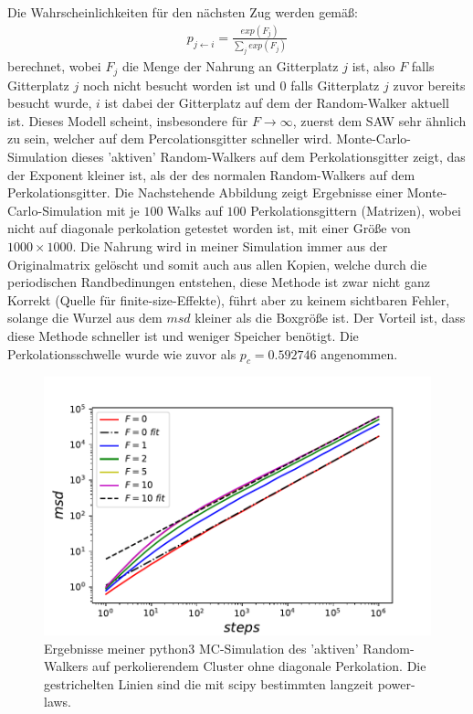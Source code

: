 \documentclass[a4paper, 12pt]{scrartcl}
\begin{document}
\noindent Die Wahrscheinlichkeiten für den nächsten Zug werden gemäß:
\begin{align}
	p_{j \leftarrow i} = \frac{exp({F_j})}{\sum_j exp({F_j})}
\end{align}
berechnet, wobei $F_j$ die Menge der Nahrung an Gitterplatz $j$ ist, also $F$ falls Gitterplatz $j$ noch nicht besucht worden ist und $0$ falls Gitterplatz $j$ zuvor bereits besucht wurde, $i$ ist dabei der Gitterplatz auf dem der Random-Walker aktuell ist. Dieses Modell scheint, insbesondere für $F \rightarrow \infty$, zuerst dem SAW sehr ähnlich zu sein, welcher auf dem Percolationsgitter schneller wird. Monte-Carlo-Simulation dieses 'aktiven' Random-Walkers auf dem Perkolationsgitter zeigt, das der Exponent kleiner ist, als der des normalen Random-Walkers auf dem Perkolationsgitter. Die Nachstehende Abbildung zeigt Ergebnisse einer Monte-Carlo-Simulation mit je $100$ Walks auf $100$ Perkolationsgittern (Matrizen), wobei nicht auf diagonale perkolation getestet worden ist, mit einer Größe von $1000 \times 1000$. Die Nahrung wird in meiner Simulation immer aus der Originalmatrix gelöscht und somit auch aus allen Kopien, welche durch die periodischen Randbedinungen entstehen, diese Methode ist zwar nicht ganz Korrekt (Quelle für finite-size-Effekte), führt aber zu keinem sichtbaren Fehler, solange die Wurzel aus dem $msd$ kleiner als die Boxgröße ist. Der Vorteil ist, dass diese Methode schneller ist und weniger Speicher benötigt. Die Perkolationsschwelle wurde wie zuvor als $p_c=0.592746$ angenommen.
\begin{figure}[h!]
	\centering
	\includegraphics[scale=0.9]{food.pdf}
	\caption{Ergebnisse meiner python3 MC-Simulation des 'aktiven' Random-Walkers auf perkolierendem Cluster ohne diagonale Perkolation. Die gestrichelten Linien sind die mit scipy bestimmten langzeit power-laws.}
\end{figure}
\newpage
\end{document}
